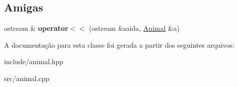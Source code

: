 \subsection*{Amigas}
\begin{DoxyCompactItemize}
\item 
\mbox{\label{classAnimal_a0e22c3745b69904b0483b137dba18957}} 
ostream \& {\bfseries operator$<$$<$} (ostream \&saida, \hyperlink{classAnimal}{Animal} \&a)
\end{DoxyCompactItemize}


A documentação para esta classe foi gerada a partir dos seguintes arquivos\+:\begin{DoxyCompactItemize}
\item 
include/animal.\+hpp\item 
src/animal.\+cpp\end{DoxyCompactItemize}

